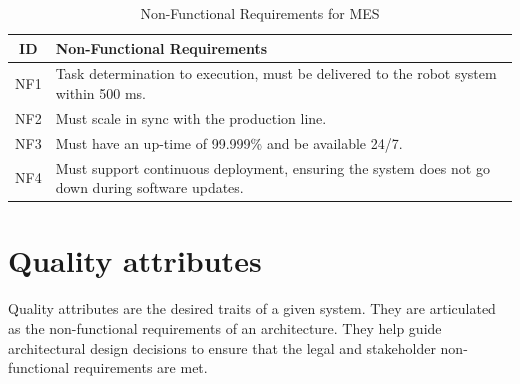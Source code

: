 \begin{table}[H]
    \centering
    \caption{Non-Functional Requirements for MES}
    \label{tab:mes_nonfunctional}
    \begin{tabular}{|c|p{6cm}|}
        \hline
        \textbf{ID} & \textbf{Non-Functional Requirements} \\
        \hline
        NF1 & Task determination to execution, must be delivered to the robot system within 500 ms. \\
        \hline
        NF2 & Must scale in sync with the production line. \\
        \hline
        NF3 & Must have an up-time of 99.999\% and be available 24/7. \\
        \hline
        NF4 & Must support continuous deployment, ensuring the system does not go down during software updates. \\
        \hline
    \end{tabular}
\end{table}

\section{Quality attributes} \label{sec:quality-attribute-scenario}
Quality attributes are the desired traits of a given system. 
They are articulated as the non-functional requirements of an architecture. They help guide architectural design decisions to ensure that the legal and stakeholder non-functional requirements are met.


